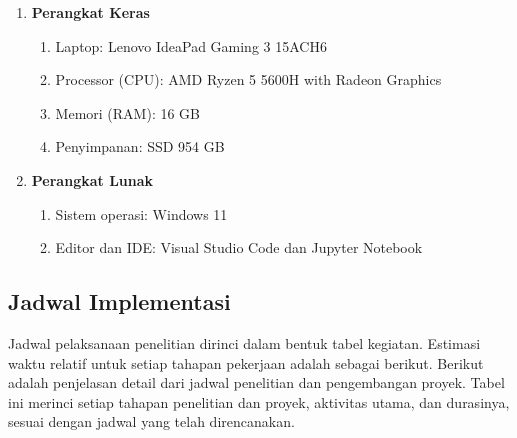 \begin{enumerate}
    \item \textbf{Perangkat Keras}
    \begin{enumerate}
        \item Laptop: Lenovo IdeaPad Gaming 3 15ACH6
        \item Processor (CPU): AMD Ryzen 5 5600H with Radeon Graphics
        \item Memori (RAM): 16 GB
        \item Penyimpanan: SSD 954 GB
    \end{enumerate}
    \item \textbf{Perangkat Lunak}
    \begin{enumerate}
        \item Sistem operasi: Windows 11
        \item Editor dan IDE: Visual Studio Code dan Jupyter Notebook
    \end{enumerate}
\end{enumerate}

\subsection{Jadwal Implementasi}
Jadwal pelaksanaan penelitian dirinci dalam bentuk tabel kegiatan. Estimasi waktu relatif untuk setiap tahapan pekerjaan adalah sebagai berikut. Berikut adalah penjelasan detail dari jadwal penelitian dan pengembangan proyek. Tabel ini merinci setiap tahapan penelitian dan proyek, aktivitas utama, dan durasinya, sesuai dengan jadwal yang telah direncanakan.


